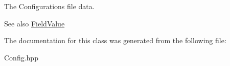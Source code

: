 The Configuration\textquotesingle{}s file data. 

\begin{DoxySeeAlso}{See also}
\mbox{\hyperlink{classZiApi_1_1FieldValue}{Field\+Value}} 
\end{DoxySeeAlso}


The documentation for this class was generated from the following file\+:\begin{DoxyCompactItemize}
\item 
Config.\+hpp\end{DoxyCompactItemize}

